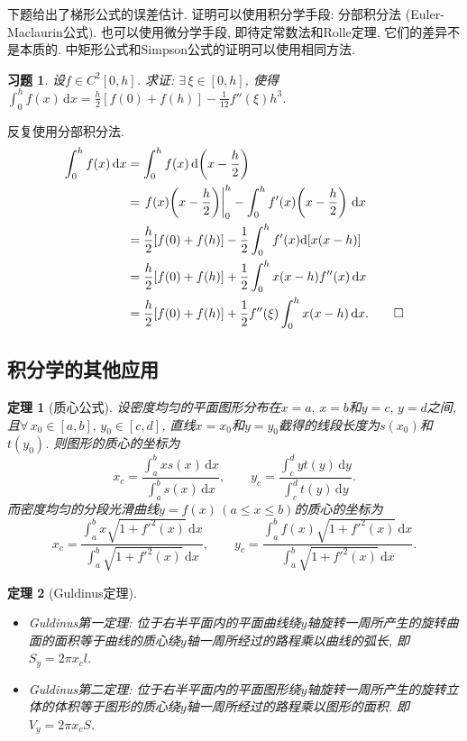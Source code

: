 \documentclass[11pt,a4paper]{ctexart}
\makeatletter
\theoremstyle{thmseries} %
\newtheorem{thm}{定理}[section]
\theoremstyle{exerseries}
\newtheorem{exer}{习题}[section]
\renewenvironment{proof}[1][\proofname]{\par
  \pushQED{\qed}%
  \normalfont \topsep6\p@\@plus6\p@\relax
  \trivlist
  \item[\hskip\labelsep
        \itshape
    #1\@addpunct{}]\ignorespaces
}{%
  \popQED\endtrivlist\@endpefalse
}
\newenvironment{pf}{\begin{proof}[\bfseries\upshape 证\quad]}{\end{proof}}
\newcommand{\bra}[1]{\mathopen{}\left(#1\right)}
\renewcommand{\d}{\mathrm{d}}
\makeatother
\begin{document}
下题给出了梯形公式的误差估计. 证明可以使用积分学手段: 分部积分法 (Euler-Maclaurin公式). 也可以使用微分学手段, 即待定常数法和Rolle定理. 它们的差异不是本质的. 中矩形公式和Simpson公式的证明可以使用相同方法. 
\begin{exer}
	设$f\in C^2[0,h]$. 求证: $\exists\,\xi\in[0,h]$, 使得$\int_{0}^{h}f(x)\,\d x=\frac{h}{2}[f(0)+f(h)]-\frac{1}{12}f''(\xi)h^3$. 
\end{exer}
\begin{pf}
	反复使用分部积分法. 
	\begin{align*}
		\int_{0}^{h}f(x)\,\d x&=\int_{0}^{h}f(x)\,\d\bra{x-\frac{h}{2}}\\
		&=\left.f(x)\bra{x-\frac{h}{2}}\right|_0^h-\int_{0}^{h}f'(x)\bra{x-\frac{h}{2}}\,\d x\\
		&=\frac{h}{2}[f(0)+f(h)]-\frac{1}{2}\int_{0}^{h}f'(x)\d[x(x-h)]\\
		&=\frac{h}{2}[f(0)+f(h)]+\frac{1}{2}\int_{0}^{h}x(x-h)f''(x)\,\d x\\
		&=\frac{h}{2}[f(0)+f(h)]+\frac{1}{2}f''(\xi)\int_{0}^{h}x(x-h)\,\d x.\qedhere
	\end{align*}
\end{pf}


\subsection{积分学的其他应用}
\begin{thm}[质心公式]
	设密度均匀的平面图形分布在$x=a,\,x=b$和$y=c,\,y=d$之间, 且$\forall\,x_0\in[a,b],\,y_0\in[c,d]$, 直线$x=x_0$和$y=y_0$截得的线段长度为$s(x_0)$和$t(y_0)$. 则图形的质心的坐标为
	\[x_c=\frac{\int_{a}^{b}xs(x)\,\d x}{\int_{a}^{b}s(x)\,\d x},\qquad y_c=\frac{\int_{c}^{d}yt(y)\,\d y}{\int_{c}^{d}t(y)\,\d y}.\]
	而密度均匀的分段光滑曲线$y=f(x)\,(a\leq x\leq b)$的质心的坐标为
	\[x_c=\frac{\int_{a}^{b}x\sqrt{1+f'^2(x)}\,\d x}{\int_{a}^{b}\sqrt{1+f'^2(x)}\,\d x},\qquad y_c=\frac{\int_{a}^{b}f(x)\sqrt{1+f'^2(x)}\,\d x}{\int_{a}^{b}\sqrt{1+f'^2(x)}\,\d x}.\]
\end{thm}

\begin{thm}[Guldinus定理]
	\phantom{text}
	\begin{itemize}
		\item Guldinus第一定理: 位于右半平面内的平面曲线绕$y$轴旋转一周所产生的旋转曲面的面积等于曲线的质心绕$y$轴一周所经过的路程乘以曲线的弧长, 即$S_y=2\pi x_cl$. 
		\item Guldinus第二定理: 位于右半平面内的平面图形绕$y$轴旋转一周所产生的旋转立体的体积等于图形的质心绕$y$轴一周所经过的路程乘以图形的面积. 即$V_y=2\pi x_cS$. 
\end{itemize}
\end{thm}
\end{document}
